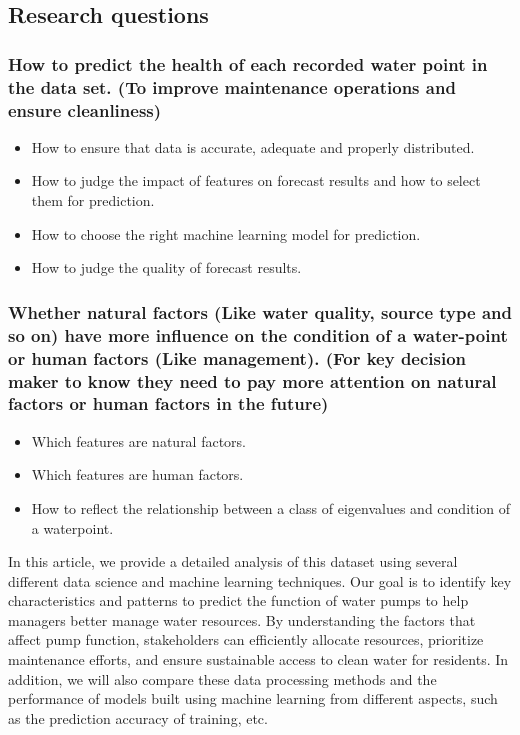 \documentclass[conference]{IEEEtran}
\begin{document}
\subsection{Research questions}

\subsubsection{How to predict the health of each recorded water point in the data set. (To improve maintenance operations and ensure cleanliness)}

\begin{itemize}
\item How to ensure that data is accurate, adequate and properly distributed.
\item How to judge the impact of features on forecast results and how to select them for prediction.
\item How to choose the right machine learning model for prediction.
\item How to judge the quality of forecast results.
\end{itemize}

\subsubsection{Whether natural factors (Like water quality, source type and so on) have more influence on the condition of a water-point or human factors (Like management). (For key decision maker to know they need to pay more attention on natural factors or human factors in the future)}

\begin{itemize}
\item Which features are natural factors.
\item Which features are human factors.
\item How to reflect the relationship between a class of eigenvalues and condition of a waterpoint.
\end{itemize}

In this article, we provide a detailed analysis of this dataset using several different data science and machine learning techniques. Our goal is to identify key characteristics and patterns to predict the function of water pumps to help managers better manage water resources. By understanding the factors that affect pump function, stakeholders can efficiently allocate resources, prioritize maintenance efforts, and ensure sustainable access to clean water for residents. In addition, we will also compare these data processing methods and the performance of models built using machine learning from different aspects, such as the prediction accuracy of training, etc.
\end{document}
